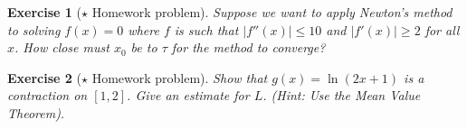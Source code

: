 \documentclass[a4paper, notitlepage,12pt]{report}
\newtheorem{exercise}{Exercise}[chapter]
\begin{document}
\begin{exercise}[$\star$  Homework problem] 
  \label{exer:Newton error formula}
  Suppose we want to apply Newton's method to solving $f(x)=0$ where $f$
  is such that  ${|f''(x)|\leq 10}$ and $|f'(x)| \geq 2$ for all
  $x$.
  How close must $x_0$ be to $\tau$ for the method to converge?
\end{exercise}

\setcounter{exercise}{14}
\begin{exercise}[$\star$ Homework problem] 
\label{exer:g contracts?}
 Show that $g(x) = \ln(2x +1)$ is a contraction on $[1,2]$. Give
an estimate for $L$. (Hint: Use the Mean Value Theorem).
\end{exercise}
\end{document}
